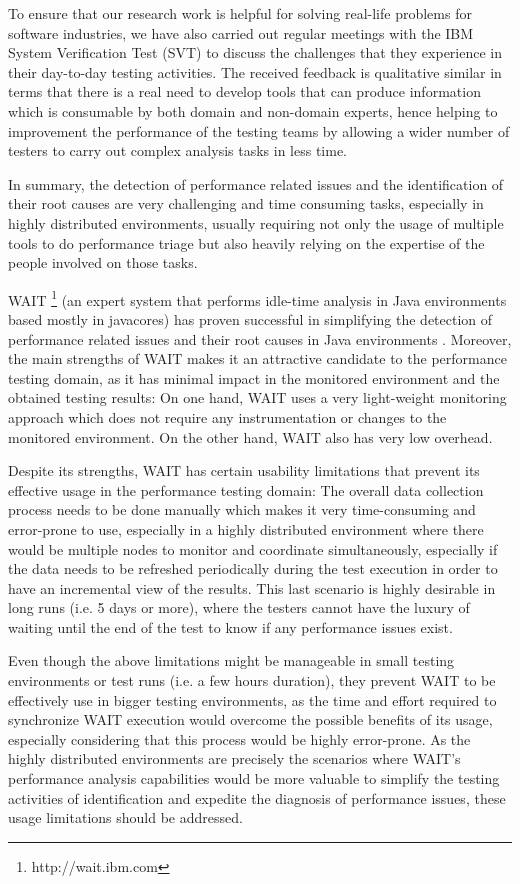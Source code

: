 \documentclass[runningheads,a4paper]{llncs}
\begin{document}
To ensure that our research work is helpful for solving real-life problems for
software industries, we have also carried out regular meetings with the IBM
System Verification Test (SVT) to discuss the challenges that they experience in
their day-to-day testing activities. The received feedback is qualitative
similar in terms that there is a real need to develop tools that can produce information 
which is consumable by both domain and non-domain experts, hence helping to
improvement the performance of the testing teams by allowing a wider number of testers to carry out 
complex analysis tasks in less time.

In summary, the detection of performance related issues and the identification
of their root causes are very challenging and time consuming tasks,
especially in highly distributed environments, usually requiring not only the
usage of multiple tools to do performance triage but also heavily relying on
the expertise of the people involved on those tasks.

WAIT \footnote{http://wait.ibm.com} (an expert system that performs idle-time
analysis in Java environments based mostly in javacores) has proven successful
in simplifying the detection of performance related issues and their root causes 
in Java environments \cite{Altman2010,Wu1}. Moreover, the main strengths of WAIT
makes it an attractive candidate to the performance testing domain, as it has minimal 
impact in the monitored environment and the obtained testing results: On one
hand, WAIT uses a very light-weight monitoring approach which does not require 
any instrumentation or changes to the monitored environment. On the other hand,
WAIT also has very low overhead.

Despite its strengths, WAIT has certain usability limitations that prevent its
effective usage in the performance testing domain: The overall data collection
process needs to be done manually which makes it very time-consuming and
error-prone to use, especially in a highly distributed environment where there
would be multiple nodes to monitor and coordinate simultaneously, especially
if the data needs to be refreshed periodically during the test execution in
order to have an incremental view of the results. This last scenario is highly
desirable in long runs (i.e. 5 days or more), where the testers cannot have the
luxury of waiting until the end of the test to know if any performance issues
exist.

Even though the above limitations might be manageable in small testing
environments or test runs (i.e. a few hours duration), they prevent WAIT to be
effectively use in bigger testing environments, as the time and effort
required to synchronize WAIT execution would overcome the possible benefits of
its usage, especially considering that this process would be highly error-prone.
As the highly distributed environments are precisely the scenarios where WAIT's
performance analysis capabilities would be more valuable to simplify the testing 
activities of identification and expedite the diagnosis of performance issues,
these usage limitations should be addressed. 
\end{document}
